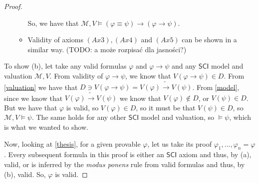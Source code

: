 \documentclass{article}
\theoremstyle{definition}
\theoremstyle{definition}
\theoremstyle{definition}
\newcommand*{\id}{\equiv}
\newcommand*{\ra}{\rightarrow}
\newcommand{\SCI}{$\mathsf{SCI}$\xspace}
\begin{document}
\begin{proof}
\begin{itemize}
\begin{itemize}
                        So, we have that $\mathcal{M}, V \models (\varphi \id \psi) \ra (\varphi \ra
                            \psi)$.

                  \item Validity of axioms $(Ax3), (Ax4)$ and $(Ax5)$ can be shown in a similar way.
                            {\color{red}(TODO: a może rozpisać dla jasności?)}
              \end{itemize}
    \end{itemize}

    To show (b), let take any valid formulas $\varphi$ and $\varphi \ra \psi$ and
    any \SCI model and valuation $\mathcal{M}, V$. From validity of $\varphi \ra
        \psi$, we know that $V(\varphi \ra \psi) \in D$. From \cref{valuation} we have
    that $D \ni V(\varphi \ra \psi) = V(\varphi) \tilde{\ra} V(\psi)$. From
    \cref{model}, since we know that $V(\varphi) \tilde{\ra} V(\psi)$ we know that
    $V(\varphi) \not \in D$, or $V(\psi) \in D$. But we have that $\varphi$ is
    valid, so $V(\varphi) \in D$, so it must be that $V(\psi) \in D$, so
    $\mathcal{M}, V \models \psi$. The same holds for any other \SCI model and
    valuation, so $\models \psi$, which is what we wanted to show.

    Now, looking at \cref{thesis}, for a given provable $\varphi$, let us take its
    proof $\varphi_1, ..., \varphi_n = \varphi$. Every subsequent formula in this
    proof is either an \SCI axiom and thus, by (a), valid, or is inferred by the
    \emph{modus ponens} rule from valid formulas and thus, by (b), valid. So,
    $\varphi$ is valid.
\end{proof}
\end{document}
